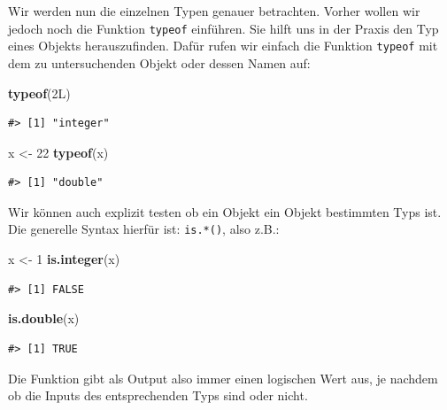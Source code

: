 \documentclass[]{tufte-book}
\newenvironment{Shaded}{}{}
\newcommand{\KeywordTok}[1]{\textcolor[rgb]{0.00,0.44,0.13}{\textbf{#1}}}
\newcommand{\DecValTok}[1]{\textcolor[rgb]{0.25,0.63,0.44}{#1}}
\newcommand{\StringTok}[1]{\textcolor[rgb]{0.25,0.44,0.63}{#1}}
\newcommand{\NormalTok}[1]{#1}
\begin{document}
Wir werden nun die einzelnen Typen genauer betrachten. Vorher wollen wir
jedoch noch die Funktion \texttt{typeof} einführen. Sie hilft uns in der
Praxis den Typ eines Objekts herauszufinden. Dafür rufen wir einfach die
Funktion \texttt{typeof} mit dem zu untersuchenden Objekt oder dessen
Namen auf:

\begin{Shaded}
\begin{Highlighting}[]
\KeywordTok{typeof}\NormalTok{(2L)}
\end{Highlighting}
\end{Shaded}

\begin{verbatim}
#> [1] "integer"
\end{verbatim}

\begin{Shaded}
\begin{Highlighting}[]
\NormalTok{x <-}\StringTok{ }\DecValTok{22}
\KeywordTok{typeof}\NormalTok{(x)}
\end{Highlighting}
\end{Shaded}

\begin{verbatim}
#> [1] "double"
\end{verbatim}

Wir können auch explizit testen ob ein Objekt ein Objekt bestimmten Typs
ist. Die generelle Syntax hierfür ist: \texttt{is.*()}, also z.B.:

\begin{Shaded}
\begin{Highlighting}[]
\NormalTok{x <-}\StringTok{ }\DecValTok{1}
\KeywordTok{is.integer}\NormalTok{(x)}
\end{Highlighting}
\end{Shaded}

\begin{verbatim}
#> [1] FALSE
\end{verbatim}

\begin{Shaded}
\begin{Highlighting}[]
\KeywordTok{is.double}\NormalTok{(x)}
\end{Highlighting}
\end{Shaded}

\begin{verbatim}
#> [1] TRUE
\end{verbatim}

Die Funktion gibt als Output also immer einen logischen Wert aus, je
nachdem ob die Inputs des entsprechenden Typs sind oder nicht.
\end{document}
